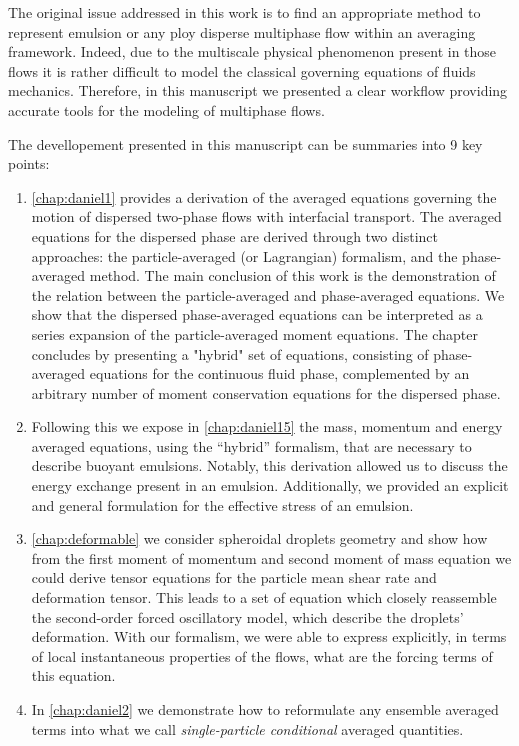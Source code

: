 
The original issue addressed in this work is to find an appropriate method to represent emulsion or any ploy disperse multiphase flow within an averaging framework.
Indeed, due to the multiscale physical phenomenon present in those flows it is rather difficult to model the classical governing equations of fluids mechanics.  
Therefore, in this manuscript we presented a clear workflow providing accurate tools for the modeling of multiphase flows. 

The devellopement presented in this manuscript can be summaries into 9 key points:
\begin{enumerate}
    \item \ref{chap:daniel1} provides a derivation of the averaged equations governing the motion of dispersed two-phase flows with interfacial transport. 
    The averaged equations for the dispersed phase are derived through two distinct approaches: the particle-averaged (or Lagrangian) formalism, and the phase-averaged method. 
    The main conclusion of this work is the demonstration of the relation between the particle-averaged and phase-averaged equations. 
    We show that the dispersed phase-averaged equations can be interpreted as a series expansion of the particle-averaged moment equations. 
    The chapter concludes by presenting a "hybrid" set of equations, consisting of phase-averaged equations for the continuous fluid phase, complemented by an arbitrary number of moment conservation equations for the dispersed phase.
    \item Following this we expose in \ref{chap:daniel15} the mass, momentum and energy averaged equations, using the ``hybrid'' formalism, that are necessary to describe buoyant emulsions. 
    Notably, this derivation allowed us to discuss the energy exchange present in an emulsion.
    Additionally, we provided an explicit and general formulation for the effective stress of an emulsion.
    \item \ref{chap:deformable} we consider spheroidal droplets geometry and show how from the first moment of momentum and second moment of mass equation we could derive tensor equations for the particle mean shear rate and deformation tensor. 
    This leads to a set of equation which closely reassemble the second-order forced oscillatory model, which describe the droplets' deformation. 
    With our formalism, we were able to express explicitly, in terms of local instantaneous properties of the flows, what are the forcing terms of this equation.  
    \item In \ref{chap:daniel2} we demonstrate how to reformulate any ensemble averaged terms into what we call \textit{single-particle conditional} averaged quantities. 

\end{enumerate}
